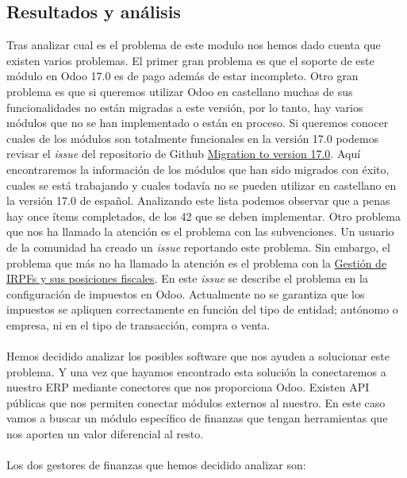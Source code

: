 \subsection{Resultados y análisis}
Tras analizar cual es el problema de este modulo nos hemos dado cuenta que existen varios problemas. El primer gran problema es que el soporte de este módulo en Odoo 17.0 es de pago además de estar incompleto. Otro gran problema es que si queremos utilizar Odoo en castellano muchas de sus funcionalidades no están migradas a este versión, por lo tanto, hay varios módulos que no se han implementado o están en proceso. Si queremos conocer cuales de los módulos son totalmente funcionales en la versión 17.0 podemos revisar el \textit{issue} del repositorio de Github \href{https://github.com/OCA/l10n-spain/issues/3298}{Migration to version 17.0}. Aquí encontraremos la información de los módulos que han sido migrados con éxito, cuales se está trabajando y cuales todavía no se pueden utilizar en castellano en la versión 17.0 de español. Analizando este lista podemos observar que a penas hay once ítems completados, de los 42 que se deben implementar. Otro problema que nos ha llamado la atención es el problema con las subvenciones. Un usuario de la comunidad ha creado un \textit{issue} reportando este problema. Sin embargo, el problema que más no ha llamado la atención es el problema con la \href{https://github.com/OCA/l10n-spain/issues/3527}{Gestión de IRPFs y sus posiciones fiscales}. En este \textit{issue} se describe el problema en la configuración de impuestos en Odoo. Actualmente no se garantiza que los impuestos se apliquen correctamente en función del tipo de entidad; autónomo o empresa, ni en el tipo de transacción, compra o venta.

\paragraph{}
Hemos decidido analizar los posibles software que nos ayuden a solucionar este problema. Y una vez que hayamos encontrado esta solución la conectaremos a nuestro ERP mediante conectores que nos proporciona Odoo. Existen API públicas que nos permiten conectar módulos externos al nuestro. En este caso vamos a buscar un módulo específico de finanzas que tengan herramientas que nos aporten un valor diferencial al resto. 

\paragraph{}
Los dos gestores de finanzas que hemos decidido analizar son: 


